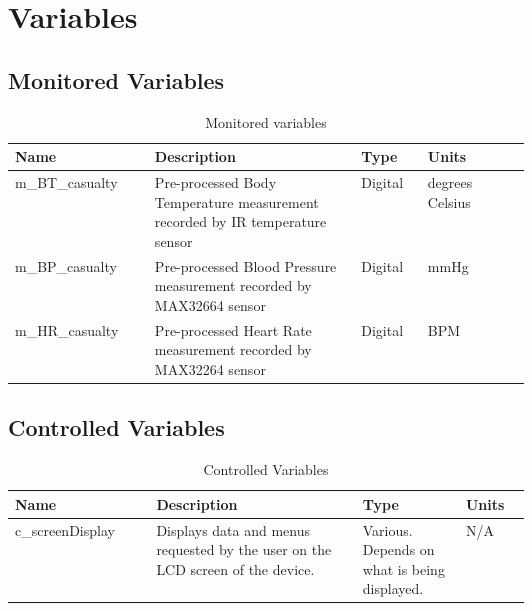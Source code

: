 \documentclass{article}
\begin{document}
	\section{Variables}
	
	\subsection{Monitored Variables}
	    \begin{longtable}{|l|p{0.4\linewidth}|l|p{0.2\linewidth}|}
	    \caption{Monitored variables}
        \hline
        \textbf{Name} & \textbf{Description} & \textbf {Type} & \textbf{Units} \\
        \endhead
        \hline
m\_BT\_casualty  & Pre-processed Body Temperature measurement   recorded by IR temperature sensor                                               & Digital & degrees Celsius      \\ \hline
m\_BP\_casualty  & Pre-processed Blood Pressure measurement recorded   by MAX32664 sensor                                                       & Digital & mmHg    \\ \hline
m\_HR\_casualty  & Pre-processed Heart Rate measurement recorded by MAX32264   sensor                                                           & Digital & BPM     \\ \hline

\end{longtable}

	\subsection{Controlled Variables}
	
	  \begin{longtable}{|l|p{0.4\linewidth}|p{0.2\linewidth}|l|}
	  \caption{Controlled Variables}
        \hline
        \textbf{Name} & \textbf{Description} & \textbf {Type} & \textbf{Units} \\
        \endhead
        \hline
        c\_screenDisplay   & Displays data and menus requested by the user on the LCD screen of the device. & Various. Depends on what is being displayed. & N/A \\ \hline
        \end{longtable}
\end{document}
